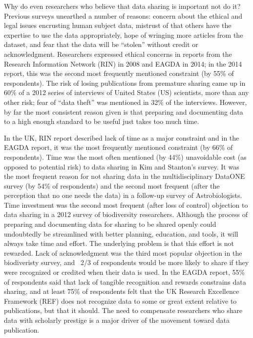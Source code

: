 \documentclass[10pt]{article}
\begin{document}
Why do even researchers who believe that data sharing is important not do it?
Previous surveys unearthed a number of reasons: concern about the ethical and legal issues encrusting human subject data, mistrust of that others have the expertise to use the data appropriately, hope of wringing more articles from the dataset, and fear that the data will be ``stolen'' without credit or acknowledgment.
Researchers expressed ethical concerns in reports from the Research Information Network (RIN) in 2008 and EAGDA in 2014; in the 2014 report, this was the second most frequently mentioned constraint (by 55\% of respondents)\cite{swann_share_2008, bobrow_establishing_2014}.
The risk of losing publications from premature sharing came up in 60\% of a 2012 series of interviews of United States (US) scientists, more than any other risk; fear of ``data theft'' was mentioned in 32\% of the interviews\cite{kim_institutional_2012}.
However, by far the most consistent reason given is that preparing and documenting data to a high enough standard to be useful just takes too much time.

In the UK, RIN report described lack of time as a major constraint\cite{swan_share_2008} and in the EAGDA report, it was the most frequently mentioned constraint (by 66\% of respondents)\cite{bobrow_establishing_2014}.
Time was the most often mentioned (by 44\%) unavoidable cost (as opposed to potential risk) to data sharing in Kim and Stanton's survey\cite{kim_institutional_2012}.
It was the most frequent reason for not sharing data in the multidisciplinary DataONE survey (by 54\% of respondents)\cite{tenopir_data_2011} and the second most frequent (after the perception that no one needs the data) in a follow-up survey of Astrobiologists\cite{aydingolu_data_2014}.
Time investment was the second most frequent (after loss of control) objection to data sharing in a 2012 survey of biodiversity researchers\cite{enke_user's_2012}.
Although the process of preparing and documenting data for sharing to be shared openly could undoubtedly be streamlined with better planning, education, and tools, it will always take time and effort.
The underlying problem is that this effort is not rewarded.
Lack of acknowledgment was the third most popular objection in the biodiveristy survey, and ~2/3 of respondents would be more likely to share if they were recognized or credited when their data is used.
In the EAGDA report, 55\% of respondents said that lack of tangible recognition and rewards constrains data sharing, and at least 75\% of respondents felt that the UK Research Excellence Framework (REF) does not recognize data to some or great extent relative to publications, but that it should.
The need to compensate researchers who share data with scholarly prestige is a major driver of the movement toward data publication.
 
\end{document}
